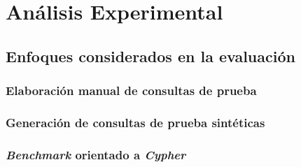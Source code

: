 \chapter{Análisis Experimental}\label{chapter: experiment}

\section{Enfoques considerados en la evaluación} \label{unused_approaches}

\subsection{Elaboración manual de consultas de prueba} \label{handmade_eval}

\subsection{Generación de consultas de prueba sintéticas} \label{synthetic_eval}

\subsection{\textit{Benchmark} orientado a \textit{Cypher}} \label{bench_eval}